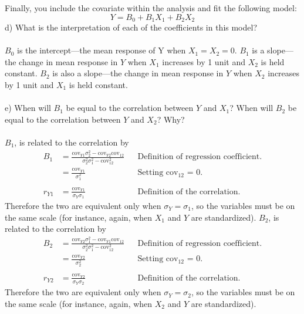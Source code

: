 \documentclass[onecolumn,10pt]{jhwhw}
\begin{document}
Finally, you include the covariate within the analysis and fit the following model:
                $$Y = B_0 + B_1 X_1 + B_2 X_2$$
d) What is the interpretation of each of the coefficients in this model?\\
\\
$B_0$ is the intercept---the mean response of Y when $X_1 = X_2 = 0$. $B_1$ is a slope---the change in mean response in $Y$ when $X_1$ increases by 1 unit and $X_2$ is held constant. $B_2$ is also a slope---the change in mean response in $Y$ when $X_2$ increases by 1 unit and $X_1$ is held constant. \\
\\
e) When will $B_1$ be equal to the correlation between $Y$ and $X_1$? When will $B_2$ be equal to the correlation between $Y$ and $X_2$? Why?\\
\\
$B_1$, is related to the correlation by
\begin{align*}
B_1 &= \frac{\mbox{cov}_{Y1} \sigma_2^2 - \mbox{cov}_{Y2} \mbox{cov}_{12}}{\sigma_{2}^2 \sigma_1^2 - \mbox{cov}_{12}^2}  && \text{Definition of regression coefficient.}\\
    &= \frac{\mbox{cov}_{Y1}}{\sigma_{1}^2} && \text{Setting cov$_{12}$ = 0.} \\
\\
r_{Y1}  &= \frac{\mbox{cov}_{Y1}}{\sigma_Y \sigma_1} && \text{Definition of the correlation.}
\end{align*}
Therefore the two are equivalent only when $\sigma_{Y} = \sigma_{1}$, so the variables must be on the same scale (for instance, again, when $X_1$ and $Y$ are standardized). $B_2$, is related to the correlation by
\begin{align*}
B_2 &= \frac{\mbox{cov}_{Y2} \sigma_1^2 - \mbox{cov}_{Y1} \mbox{cov}_{12}}{\sigma_{2}^2 \sigma_1^2 - \mbox{cov}_{12}^2} && \text{Definition of regression coefficient.} \\
    &= \frac{\mbox{cov}_{Y2}}{\sigma_{2}^2} && \text{Setting cov$_{12}$ = 0.} \\
\\
r_{Y2}  &= \frac{\mbox{cov}_{Y2}}{\sigma_Y \sigma_2} && \text{Definition of the correlation.}
\end{align*}
Therefore the two are equivalent only when $\sigma_{Y} = \sigma_{2}$, so the variables must be on the same scale (for instance, again, when $X_2$ and $Y$ are standardized).\\
\end{document}
